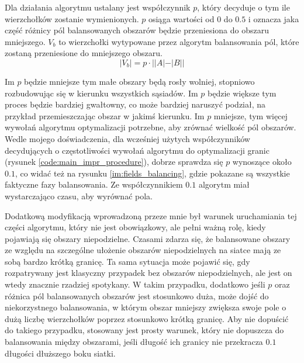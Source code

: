 \newpage
Dla działania algorytmu ustalany jest współczynnik $p$, który decyduje o tym ile wierzchołków zostanie wymienionych.
$p$ osiąga wartości od $0$ do $0.5$ i oznacza jaka część różnicy pól balansowanych obszarów będzie przeniesiona do obszaru
mniejszego.
$V_b$ to wierzchołki wytypowane przez algorytm balansowania pól, które zostaną przeniesione do mniejszego
obszaru.
\begin{equation}
|V_b| = p \cdot ||A| - |B||
\end{equation}

Im $p$ będzie mniejsze tym małe obszary będą rosły wolniej, stopniowo rozbudowując się w kierunku wszystkich sąsiadów.
Im $p$ będzie większe tym proces będzie bardziej gwałtowny, co może bardziej naruszyć podział, na przykład przemieszczając
obszar w jakimś kierunku.
Im $p$ mniejsze, tym więcej wywołań algorytmu optymalizacji potrzebne, aby zrównać wielkość pól obszarów.
Wedle mojego doświadczenia, dla wcześniej użytych współczynników decydujących o częstotliwości
wywołań algorytmu do optymalizacji granic (rysunek \ref{code:main_impr_procedure}), dobrze sprawdza się $p$ wynoszące
około $0.1$, co widać też na rysunku \ref{im:fields_balancing}, gdzie pokazane są wszystkie faktyczne fazy balansowania.
Ze współczynnikiem $0.1$ algorytm miał wystarczająco czasu, aby wyrównać pola.

Dodatkową modyfikacją wprowadzoną przeze mnie był warunek uruchamiania tej części algorytmu, który nie jest obowiązkowy,
ale pełni ważną rolę, kiedy pojawiają się obszary niepodzielne.
Czasami zdarza się, że balansowane obszary ze względu na szczególne ułożenie obszarów niepodzielnych na siatce
mają ze sobą bardzo krótką granicę.
Ta sama sytuacja może pojawić się, gdy rozpatrywany jest klasyczny przypadek bez obszarów
niepodzielnych, ale jest on wtedy znacznie rzadziej spotykany.
W takim przypadku, dodatkowo jeśli $p$ oraz różnica pól balansowanych obszarów jest stosunkowo duża, może dojść
do niekorzystnego balansowania, w którym obszar mniejszy zwiększa swoje pole o dużą liczbę wierzchołków poprzez
stosunkowo krótką granicę.
Aby nie dopuścić do takiego przypadku, stosowany jest prosty warunek, który nie dopuszcza do balansowania
między obszarami, jeśli długość ich granicy nie przekracza $0.1$ długości dłuższego boku siatki.

